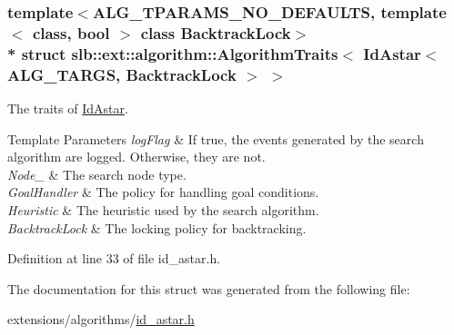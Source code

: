 \subsubsection*{template$<$A\+L\+G\+\_\+\+T\+P\+A\+R\+A\+M\+S\+\_\+\+N\+O\+\_\+\+D\+E\+F\+A\+U\+L\+TS, template$<$ class, bool $>$ class Backtrack\+Lock$>$\\*
struct slb\+::ext\+::algorithm\+::\+Algorithm\+Traits$<$ Id\+Astar$<$ A\+L\+G\+\_\+\+T\+A\+R\+G\+S, Backtrack\+Lock $>$ $>$}

The traits of \hyperlink{structslb_1_1ext_1_1algorithm_1_1IdAstar}{Id\+Astar}. 


\begin{DoxyTemplParams}{Template Parameters}
{\em log\+Flag} & If {\ttfamily true}, the events generated by the search algorithm are logged. Otherwise, they are not. \\
\hline
{\em Node\+\_\+} & The search node type. \\
\hline
{\em Goal\+Handler} & The policy for handling goal conditions. \\
\hline
{\em Heuristic} & The heuristic used by the search algorithm. \\
\hline
{\em Backtrack\+Lock} & The locking policy for backtracking. \\
\hline
\end{DoxyTemplParams}


Definition at line 33 of file id\+\_\+astar.\+h.



The documentation for this struct was generated from the following file\+:\begin{DoxyCompactItemize}
\item 
extensions/algorithms/\hyperlink{id__astar_8h}{id\+\_\+astar.\+h}\end{DoxyCompactItemize}
